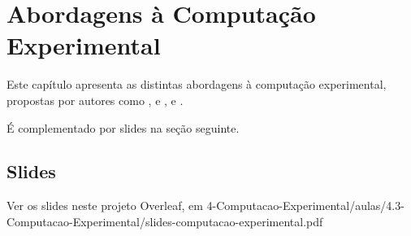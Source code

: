 \chapter{Abordagens à Computação Experimental}

Este capítulo apresenta as distintas abordagens à computação experimental, propostas por autores como \citet{mcgeoch_experimental_2007}, \citet{cohen_empirical_1995} e \citet{fleischer_experimental_2002}, e \citet{juristo_basics_2001}.

É complementado por slides na seção seguinte.

\section{Slides}
Ver os slides neste projeto Overleaf, em
4-Computacao-Experimental/aulas/4.3-Computacao-Experimental/slides-computacao-experimental.pdf
%
